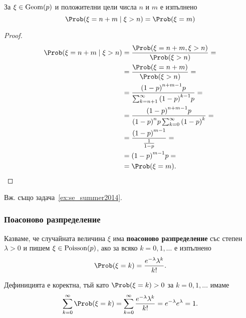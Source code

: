 \documentclass[numbers=endperiod, bibliography=totocnumbered]{scrartcl}
\begin{document}
\begin{theorem}\label{thm:memorylessness}
  За \( \xi \in \operatorname{Geom}(p) \) и положителни цели числа \( n \) и \( m \) е изпълнено
  \begin{equation*}
    \Prob(\xi = n + m \mid \xi > n) = \Prob(\xi = m)
  \end{equation*}
\end{theorem}
\begin{proof}
  \begin{align*}
    \Prob(\xi = n + m \mid \xi > n)
    &=
    \frac {\Prob(\xi = n + m, \xi > n)} {\Prob(\xi > n)}
    = \\ &=
    \frac {\Prob(\xi = n + m)} {\Prob(\xi > n)}
    = \\ &=
    \frac {{(1-p)}^{n+m-1} p} {\sum_{k=n+1}^\infty {(1-p)}^{k-1} p}
    = \\ &=
    \frac {{(1-p)}^{n+m-1} p} {{(1-p)}^n p \sum_{k=0}^\infty {(1-p)}^k}
    = \\ &=
    \frac {{(1-p)}^{m-1}} {\frac 1 {1 - p}}
    = \\ &=
    {(1-p)}^{m-1} p
    = \\ &=
    \Prob(\xi = m).
  \end{align*}
\end{proof}

Вж. също задача~\ref{ex:se_summer2014}.

\subsubsection{Поасоново разпределение}\label{dist:poisson}

\begin{definition}
  Казваме, че случайната величина \( \xi \) има \textbf{поасоново разпределение} със степен \( \lambda > 0 \) и пишем \( \xi \in \operatorname{Poisson}(p) \), ако за всяко \( k = 0, 1, \ldots \) е изпълнено
  \begin{equation*}
    \Prob(\xi = k) = \frac{e^{-\lambda} \lambda^k} {k!}.
  \end{equation*}

  Дефиницията е коректна, тъй като \( \Prob(\xi = k) > 0 \) за \( k = 0, 1, \ldots \) имаме
  \begin{equation*}
    \sum_{k=0}^\infty \Prob(\xi = k)
    =
    \sum_{k=0}^\infty \frac{e^{-\lambda} \lambda^k} {k!}
    =
    e^{-\lambda} e^{\lambda}
    =
    1.
  \end{equation*}
\end{definition}
\end{document}
